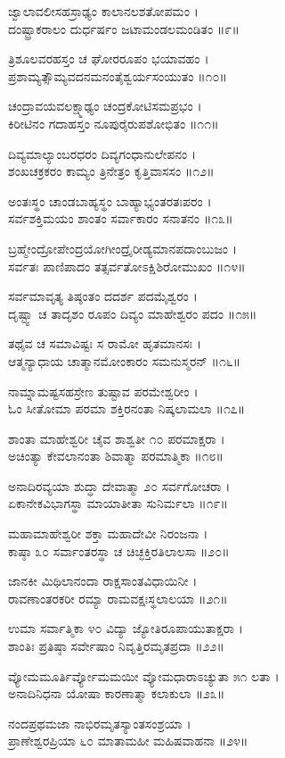 ಜ್ವಾಲಾವಲೀಸಹಸ್ರಾಢ್ಯಂ ಕಾಲಾನಲಶತೋಪಮಂ ।\\
ದಂಷ್ಟ್ರಾಕರಾಲಂ ದುರ್ಧರ್ಷಂ ಜಟಾಮಂಡಲಮಂಡಿತಂ ॥೯॥

ತ್ರಿಶೂಲವರಹಸ್ತಂ ಚ ಘೋರರೂಪಂ ಭಯಾವಹಂ ।\\
ಪ್ರಶಾಮ್ಯತ್ಸೌಮ್ಯವದನಮನಂತೈಶ್ವರ್ಯಸಂಯುತಂ ॥೧೦॥

ಚಂದ್ರಾವಯವಲಕ್ಷ್ಮಾಢ್ಯಂ ಚಂದ್ರಕೋಟಿಸಮಪ್ರಭಂ ।\\
ಕಿರೀಟಿನಂ ಗದಾಹಸ್ತಂ ನೂಪುರೈರುಪಶೋಭಿತಂ ॥೧೧॥

ದಿವ್ಯಮಾಲ್ಯಾಂಬರಧರಂ ದಿವ್ಯಗಂಧಾನುಲೇಪನಂ ।\\
ಶಂಖಚಕ್ರಕರಂ ಕಾಮ್ಯಂ ತ್ರಿನೇತ್ರಂ ಕೃತ್ತಿವಾಸಸಂ ॥೧೨॥

ಅಂತಃಸ್ಥಂ ಚಾಂಡಬಾಹ್ಯಸ್ಥಂ ಬಾಹ್ಯಾಭ್ಯಂತರತಃಪರಂ ।\\
ಸರ್ವಶಕ್ತಿಮಯಂ ಶಾಂತಂ ಸರ್ವಾಕಾರಂ ಸನಾತನಂ ॥೧೩॥

ಬ್ರಹ್ಮೇಂದ್ರೋಪೇಂದ್ರಯೋಗೀಂದ್ರೈರೀಡ್ಯಮಾನಪದಾಂಬುಜಂ ।\\
ಸರ್ವತಃ ಪಾಣಿಪಾದಂ ತತ್ಸರ್ವತೋಽಕ್ಷಿಶಿರೋಮುಖಂ ॥೧೪॥

ಸರ್ವಮಾವೃತ್ಯ ತಿಷ್ಠಂತಂ ದದರ್ಶ ಪದಮೈಶ್ವರಂ ।\\
ದೃಷ್ಟ್ವಾ ಚ ತಾದೃಶಂ ರೂಪಂ ದಿವ್ಯಂ ಮಾಹೇಶ್ವರಂ ಪದಂ ॥೧೫॥

ತಥೈವ ಚ ಸಮಾವಿಷ್ಟಃ ಸ ರಾಮೋ ಹೃತಮಾನಸಃ ।\\
ಆತ್ಮನ್ಯಾಧಾಯ ಚಾತ್ಮಾನಮೋಂಕಾರಂ ಸಮನುಸ್ಮರನ್ ॥೧೬॥

ನಾಮ್ನಾಮಷ್ಟಸಹಸ್ರೇಣ ತುಷ್ಟಾವ ಪರಮೇಶ್ವರೀಂ ।\\

ಓಂ ಸೀತೋಮಾ ಪರಮಾ ಶಕ್ತಿರನಂತಾ ನಿಷ್ಕಲಾಮಲಾ ॥೧೭॥

ಶಾಂತಾ ಮಾಹೇಶ್ವರೀ ಚೈವ ಶಾಶ್ವತೀ ೧೦ ಪರಮಾಕ್ಷರಾ ।\\
ಅಚಿಂತ್ಯಾ ಕೇವಲಾನಂತಾ ಶಿವಾತ್ಮಾ ಪರಮಾತ್ಮಿಕಾ ॥೧೮॥

ಅನಾದಿರವ್ಯಯಾ ಶುದ್ಧಾ ದೇವಾತ್ಮಾ ೨೦ ಸರ್ವಗೋಚರಾ ।\\
ಏಕಾನೇಕವಿಭಾಗಸ್ಥಾ ಮಾಯಾತೀತಾ ಸುನಿರ್ಮಲಾ ॥೧೯॥

ಮಹಾಮಾಹೇಶ್ವರೀ ಶಕ್ತಾ ಮಹಾದೇವೀ ನಿರಂಜನಾ ।\\
ಕಾಷ್ಠಾ ೩೦ ಸರ್ವಾಂತರಸ್ಥಾ ಚ ಚಿಚ್ಛಕ್ತಿರತಿಲಾಲಸಾ ॥೨೦॥

ಜಾನಕೀ ಮಿಥಿಲಾನಂದಾ ರಾಕ್ಷಸಾಂತವಿಧಾಯಿನೀ ।\\
ರಾವಣಾಂತರಕರೀ ರಮ್ಯಾ ರಾಮವಕ್ಷಃಸ್ಥಲಾಲಯಾ ॥೨೧॥

ಉಮಾ ಸರ್ವಾತ್ಮಿಕಾ ೪೦ ವಿದ್ಯಾ ಜ್ಯೋತಿರೂಪಾಯುತಾಕ್ಷರಾ ।\\
ಶಾಂತಿಃ ಪ್ರತಿಷ್ಠಾ ಸರ್ವೇಷಾಂ ನಿವೃತ್ತಿರಮೃತಪ್ರದಾ ॥೨೨॥

ವ್ಯೋಮಮೂರ್ತಿರ್ವ್ಯೋಮಮಯೀ ವ್ಯೋಮಧಾರಾಽಚ್ಯುತಾ ೫೧ ಲತಾ ।\\
ಅನಾದಿನಿಧನಾ ಯೋಷಾ ಕಾರಣಾತ್ಮಾ ಕಲಾಕುಲಾ ॥೨೩॥

ನಂದಪ್ರಥಮಜಾ ನಾಭಿರಮೃತಸ್ಯಾಂತಸಂಶ್ರಯಾ ।\\
ಪ್ರಾಣೇಶ್ವರಪ್ರಿಯಾ ೬೦ ಮಾತಾಮಹೀ ಮಹಿಷವಾಹನಾ ॥೨೪॥

